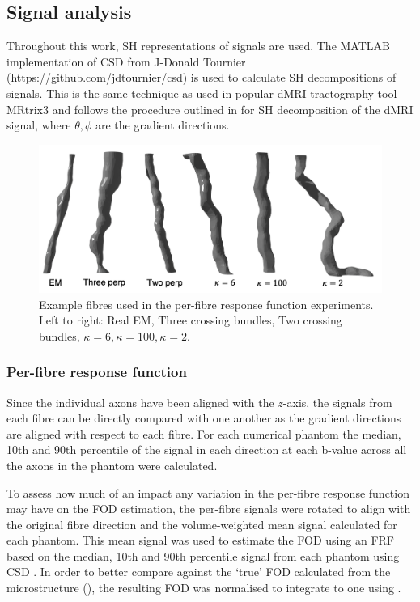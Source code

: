 \subsection{Signal analysis}
\label{sec:frf_signal_analysis}
Throughout this work, \ac{SH} representations of signals are used. The MATLAB implementation of \ac{CSD} \cite{Tournier2007} from J-Donald Tournier (\url{https://github.com/jdtournier/csd}) is used to calculate \ac{SH} decompositions of signals. This is the same technique as used in popular \ac{dMRI} tractography tool MRtrix3 \cite{Tournier2019} and follows the procedure outlined in  for \ac{SH} decomposition of the \ac{dMRI} signal, where $\theta, \phi$ are the gradient directions.
\begin{figure}
  \centering
 \includegraphics[width=\textwidth]{figures/frf_experiment/fibre_examples_caption}
  \caption[Example fibres used in the per-fibre response function experiments]{Example fibres used in the per-fibre response function experiments. Left to right: Real EM, Three crossing bundles, Two crossing bundles, $\kappa=6, \kappa=100, \kappa=2$.}
  \label{fig:frf_example_fibres}
\end{figure}
\subsubsection{Per-fibre response function}
\label{sec:frf_sig_proc_per_fibre}
Since the individual axons have been aligned with the $z$-axis, the signals from each fibre can be directly compared with one another as the gradient directions are aligned with respect to each fibre.
For each numerical phantom the median, 10th and 90th percentile of the signal in each direction at each b-value across all the axons in the phantom were calculated.

To assess how much of an impact any variation in the per-fibre response function may have on the \ac{FOD} estimation, the per-fibre signals were rotated to align with the original fibre direction and the volume-weighted mean signal calculated for each phantom. This mean signal was used to estimate the \ac{FOD} using an \ac{FRF} based on the median, 10th and 90th percentile signal from each phantom using \ac{CSD} \cite{Tournier2019,Tournier2007}. In order to better compare against the `true' \ac{FOD} calculated from the microstructure (), the resulting \ac{FOD} was normalised to integrate to one using .

